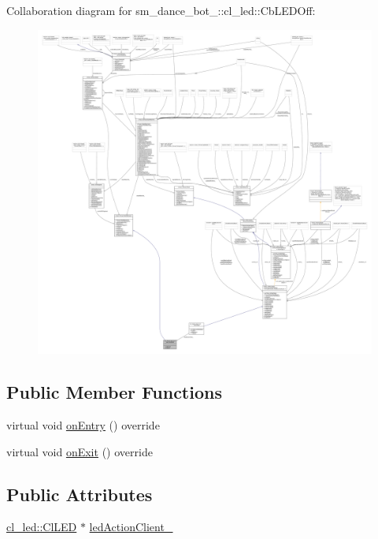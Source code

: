Collaboration diagram for sm\+\_\+dance\+\_\+bot\+\_\+:\+:cl\+\_\+led\+:\+:Cb\+L\+E\+D\+Off\+:
\nopagebreak
\begin{figure}[H]
\begin{center}
\leavevmode
\includegraphics[width=350pt]{classsm__dance__bot__3_1_1cl__led_1_1CbLEDOff__coll__graph}
\end{center}
\end{figure}
\subsection*{Public Member Functions}
\begin{DoxyCompactItemize}
\item 
virtual void \hyperlink{classsm__dance__bot__3_1_1cl__led_1_1CbLEDOff_abc46c8bc47a858c1140f3df6875a1b7a}{on\+Entry} () override
\item 
virtual void \hyperlink{classsm__dance__bot__3_1_1cl__led_1_1CbLEDOff_a0199329ec77ae6ab0cc68e56db4e0db6}{on\+Exit} () override
\end{DoxyCompactItemize}
\subsection*{Public Attributes}
\begin{DoxyCompactItemize}
\item 
\hyperlink{classsm__dance__bot__3_1_1cl__led_1_1ClLED}{cl\+\_\+led\+::\+Cl\+L\+ED} $\ast$ \hyperlink{classsm__dance__bot__3_1_1cl__led_1_1CbLEDOff_a130873f0a017df2f8f5e564df64c0a1e}{led\+Action\+Client\+\_\+}
\end{DoxyCompactItemize}


